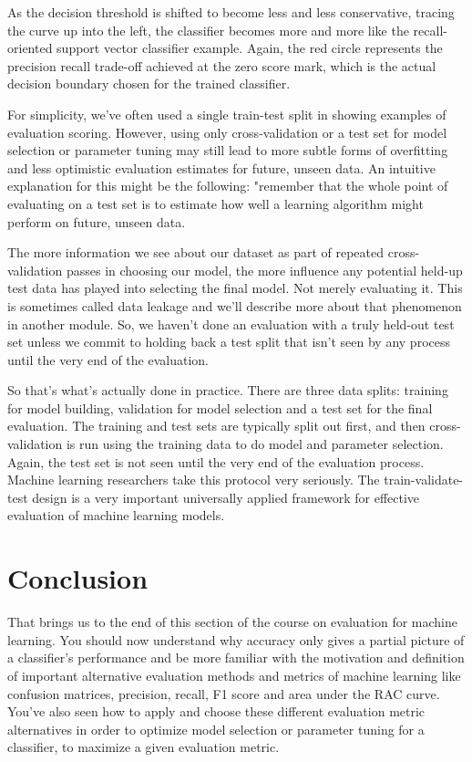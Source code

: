 \begin{multicols}{2}
As the decision threshold is shifted to become less and less conservative, tracing the curve up into the left, the classifier becomes more and more like the recall-oriented support vector classifier example. Again, the red circle represents the precision recall trade-off achieved at the zero score mark, which is the actual decision boundary chosen for the trained classifier. 

For simplicity, we've often used a single train-test split in showing examples of evaluation scoring. However, using only cross-validation or a test set for model selection or parameter tuning may still lead to more subtle forms of overfitting and less optimistic evaluation estimates for future, unseen data. An intuitive explanation for this might be the following: "remember that the whole point of evaluating on a test set is to estimate how well a learning algorithm might perform on future, unseen data. 

The more information we see about our dataset as part of repeated cross-validation passes in choosing our model, the more influence any potential held-up test data has played into selecting the final model. Not merely evaluating it. This is sometimes called data leakage and we'll describe more about that phenomenon in another module. So, we haven't done an evaluation with a truly held-out test set unless we commit to holding back a test split that isn't seen by any process until the very end of the evaluation. 

So that's what's actually done in practice. There are three data splits: training for model building, validation for model selection and a test set for the final evaluation. The training and test sets are typically split out first, and then cross-validation is run using the training data to do model and parameter selection. Again, the test set is not seen until the very end of the evaluation process. Machine learning researchers take this protocol very seriously. The train-validate-test design is a very important universally applied framework for effective evaluation of machine learning models. 

\section{Conclusion}

That brings us to the end of this section of the course on evaluation for machine learning. You should now understand why accuracy only gives a partial picture of a classifier's performance and be more familiar with the motivation and definition of important alternative evaluation methods and metrics of machine learning like confusion matrices, precision, recall, F1 score and area under the RAC curve. 
You've also seen how to apply and choose these different evaluation metric alternatives in order to optimize model selection or parameter tuning for a classifier, to maximize a given evaluation metric. 


\end{multicols}
